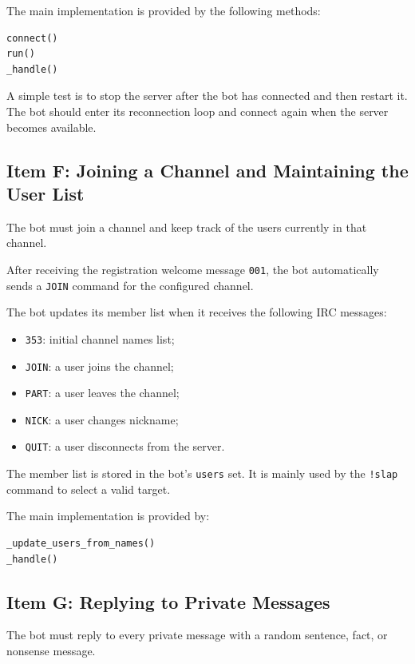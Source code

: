 \documentclass[a4paper,12pt]{article}
\begin{document}
The main implementation is provided by the following methods:

\begin{lstlisting}[language=Python]
connect()
run()
_handle()
\end{lstlisting}

A simple test is to stop the server after the bot has connected and then restart it. The bot should enter its reconnection loop and connect again when the server becomes available.

\subsection{Item F: Joining a Channel and Maintaining the User List}

The bot must join a channel and keep track of the users currently in that channel.

After receiving the registration welcome message \texttt{001}, the bot automatically sends a \texttt{JOIN} command for the configured channel.

The bot updates its member list when it receives the following IRC messages:

\begin{itemize}
    \item \texttt{353}: initial channel names list;
    \item \texttt{JOIN}: a user joins the channel;
    \item \texttt{PART}: a user leaves the channel;
    \item \texttt{NICK}: a user changes nickname;
    \item \texttt{QUIT}: a user disconnects from the server.
\end{itemize}

The member list is stored in the bot's \texttt{users} set. It is mainly used by the \texttt{!slap} command to select a valid target.

The main implementation is provided by:

\begin{lstlisting}[language=Python]
_update_users_from_names()
_handle()
\end{lstlisting}

\subsection{Item G: Replying to Private Messages}

The bot must reply to every private message with a random sentence, fact, or nonsense message.
\end{document}
